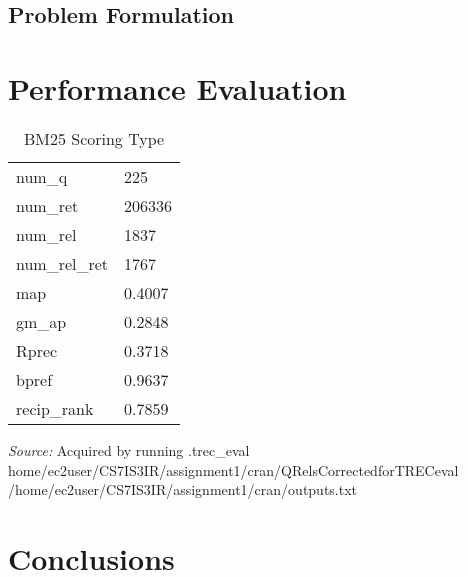 \subsection{Problem Formulation}

\section{Performance Evaluation}

\begin{table}%
\caption{BM25 Scoring Type}
\label{tab:one}
\begin{minipage}{\columnwidth}
\begin{center}
\begin{tabular}{ll}
  \toprule
  num\_q     & 225\\
  num\_ret   & 206336\\
  num\_rel   & 1837\\
  num\_rel\_ret   & 1767\\
  map   & 0.4007\\
  gm\_ap       & 0.2848\\
  R\-prec     & 0.3718\\
  bpref & 0.9637\\
  recip\_rank    & 0.7859\\
  \bottomrule
\end{tabular}
\end{center}
\bigskip\centering
\footnotesize\emph{Source:} Acquired by running .\/trec_eval \/home/ec2\-user/CS7IS3\-IR/assignment1/cran/QRelsCorrectedforTRECeval /home/ec2\-user/CS7IS3\-IR/assignment1/cran/outputs.txt 


 
\end{minipage}
\end{table}%


\section{Conclusions}


